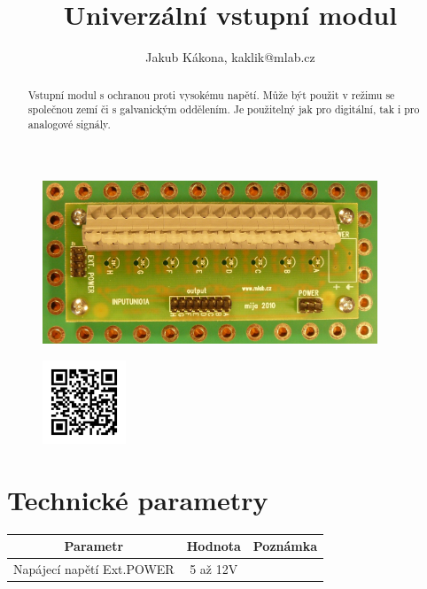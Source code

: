 \documentclass[12pt,a4paper,oneside]{article}
\begin{document}
\title{Univerzální vstupní modul}
\author{Jakub Kákona, kaklik@mlab.cz}
\maketitle

\thispagestyle{empty}
\begin{abstract}
Vstupní modul s ochranou proti vysokému napětí. Může být použit v režimu se společnou zemí či s galvanickým oddělením. Je použitelný jak pro digitální, tak i pro analogové signály.
\end{abstract}

\begin{figure} [htbp]
\begin{center}
\includegraphics [width=100mm] {./img/INPUTUNI01A_Top_Big.jpg} 
\end{center}
\end{figure}

\begin{figure} [b]
\includegraphics [width=25mm] {./img/INPUTUNI01A_QRcode.png} 
\end{figure}

\newpage
\tableofcontents

\section{Technické parametry}
\begin{table}[htbp]
\begin{center}
\begin{tabular}{|c|c|p{4.7cm}|}
\hline
Parametr & Hodnota & Poznámka \\
\hline
Napájecí napětí Ext.POWER  & 5 až 12V & \\ 
\hline
\end{tabular}
\end{center}
\end{table}
\end{document}
